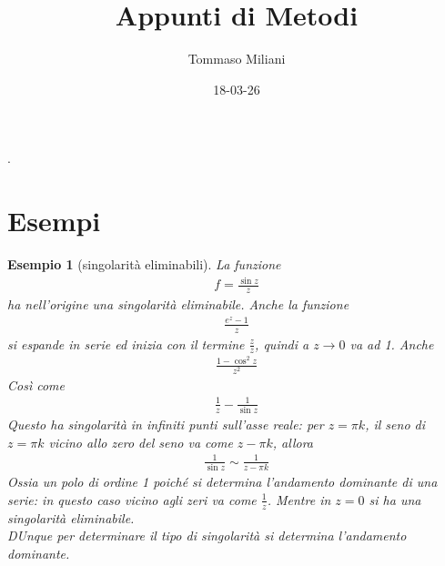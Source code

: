 \documentclass[a4paper, oneside]{article}
\title{Appunti di Metodi}
\author{Tommaso Miliani}
\date{18-03-26}
\begin{document}
                {}          %
                {}          %
                {\slshape}  %
                {}          %
                {\bfseries} %
                {.}         %
                {\newline}  %
                {}          %
\theoremstyle{theoremEnv}

\newtheorem{definition}{Definizione}[section]
\newtheorem{theorem}{Teorema}[section]
\newtheorem{lemma}{Proposizione}[section]
\newtheorem{observation}{Osservazione}[section]
\newtheorem{corollary}{Corollario}[theorem]
\newtheorem{example}{Esempio}[section]
\newtheorem{remark}{Enunciato}[section]

\maketitle

\section{Esempi}
\begin{example}[singolarità eliminabili]
    La funzione 
    \begin{gather*}
        f = \frac{\sin z}{z}
    \end{gather*}
    ha nell'origine una singolarità eliminabile. Anche la funzione 
    \begin{gather*}
        \frac{e^{z} - 1}{z}
    \end{gather*}
    si espande in serie ed inizia con il termine $\frac{z}{z}$, quindi a $z \to 0$ va ad 1.
    Anche 
    \begin{gather*}
        \frac{1 - \cos^{2}z}{z^{2}}
    \end{gather*}
    Così come 
    \begin{gather*}
        \frac{1}{z} - \frac{1}{\sin z}
    \end{gather*}
    Questo ha singolarità in infiniti punti sull'asse reale: per $z = \pi k$, 
    il seno di $z = \pi k$ vicino allo zero del seno va come $z - \pi k$, allora 
    \begin{gather*}
        \frac{1}{\sin z} \sim \frac{1}{z - \pi k}
    \end{gather*}
    Ossia un polo di ordine 1 poiché si determina l'andamento dominante di una serie: 
    in questo caso vicino agli zeri va come $\frac{1}{z}$. Mentre in $z = 0$ 
    si ha una singolarità eliminabile. \\
    DUnque per determinare il tipo di singolarità si determina l'andamento dominante.
\end{example}
\end{document}
